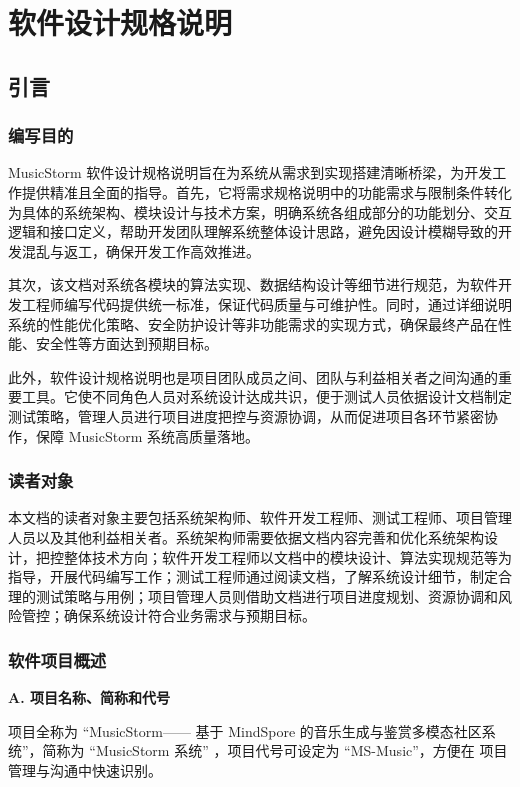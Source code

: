\documentclass{base}
\numberwithin{figure}{section} %
\begin{document}
\section{软件设计规格说明}

\subsection{引言}

\subsubsection{编写目的}

MusicStorm 软件设计规格说明旨在为系统从需求到实现搭建清晰桥梁，为开发工作提供精准且全面的指导。首先，它将需求规格说明中的功能需求与限制条件转化为具体的系统架构、模块设计与技术方案，明确系统各组成部分的功能划分、交互逻辑和接口定义，帮助开发团队理解系统整体设计思路，避免因设计模糊导致的开发混乱与返工，确保开发工作高效推进。

其次，该文档对系统各模块的算法实现、数据结构设计等细节进行规范，为软件开发工程师编写代码提供统一标准，保证代码质量与可维护性。同时，通过详细说明系统的性能优化策略、安全防护设计等非功能需求的实现方式，确保最终产品在性能、安全性等方面达到预期目标。

此外，软件设计规格说明也是项目团队成员之间、团队与利益相关者之间沟通的重要工具。它使不同角色人员对系统设计达成共识，便于测试人员依据设计文档制定测试策略，管理人员进行项目进度把控与资源协调，从而促进项目各环节紧密协作，保障 MusicStorm 系统高质量落地。

\subsubsection{读者对象}

本文档的读者对象主要包括系统架构师、软件开发工程师、测试工程师、项目管理人员以及其他利益相关者。系统架构师需要依据文档内容完善和优化系统架构设计，把控整体技术方向；软件开发工程师以文档中的模块设计、算法实现规范等为指导，开展代码编写工作；测试工程师通过阅读文档，了解系统设计细节，制定合理的测试策略与用例；项目管理人员则借助文档进行项目进度规划、资源协调和风险管控；确保系统设计符合业务需求与预期目标。

\subsubsection{软件项目概述}

\textbf{A. 项目名称、简称和代号​}

项目全称为 “MusicStorm—— 基于 MindSpore 的音乐生成与鉴赏多模态社区系	统”，简称为 “MusicStorm 系统” ，项目代号可设定为 “MS-Music”，方便在	项目管理与沟通中快速识别。​
\end{document}
